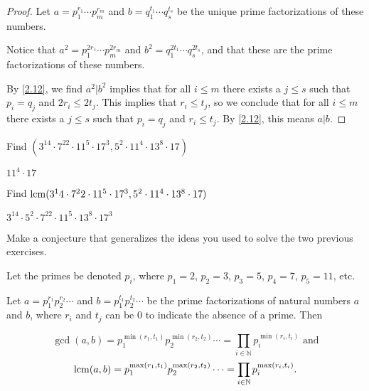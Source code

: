 \documentclass[../main.tex]{subfiles}
\begin{document}
\begin{proof}
  Let $a = p_1^{r_1} \cdots p_m^{r_m}$ and $b = q_1^{t_1} \cdots q_s^{t_s}$ be the unique prime factorizations of these numbers.

  Notice that $a^2 = p_1^{2r_1} \cdots p_m^{2r_m}$ and $b^2 = q_1^{2t_1} \cdots q_s^{2t_s}$, and that these are the prime factorizations of these numbers.

  By \ref{2.12}, we find $a^2 | b^2$ implies that for all $i \leq m$ there exists a $j \leq s$ such that $p_i = q_j$ and $2r_i \leq 2t_j$. This implies that $r_i \leq t_j$, so we conclude that for all $i \leq m$ there exists a $j \leq s$ such that $p_i = q_j$ and $r_i \leq t_j$. By \ref{2.12}, this means $a | b$.
\end{proof}



\begin{ex} \label{2.14}
  Find $(3^14 \cdot 7^22 \cdot 11^5 \cdot 17^3, 5^2 \cdot 11^4 \cdot 13^8 \cdot 17)$
\end{ex}

$11^4 \cdot 17$



\begin{ex} \label{2.15}
  Find $\operatorname{lcm} (3^14 \cdot 7^22 \cdot 11^5 \cdot 17^3, 5^2 \cdot 11^4 \cdot 13^8 \cdot 17)$
\end{ex}

$3^14 \cdot 5^2 \cdot 7^22 \cdot 11^5 \cdot 13^8 \cdot 17^3$



\begin{ex} \label{2.16}
  Make a conjecture that generalizes the ideas you used to solve the two previous exercises.
\end{ex}

\begin{PC} \label{PC 2.16}
  Let the primes be denoted $p_i$, where $p_1 = 2$, $p_2 = 3$, $p_3 = 5$, $p_4 = 7$, $p_5 = 11$, etc.

  Let $a = p_1^{r_1} p_2^{r_2} \cdots$ and $b = p_1^{t_1} p_2^{t_2} \cdots$ be the prime factorizations of natural numbers $a$ and $b$, where $r_i$ and $t_j$ can be $0$ to indicate the absence of a prime. Then

  $$\gcd (a, b) = p_1^{\min(r_1, t_1)} p_2^{\min(r_2, t_2)} \cdots = \prod_{i \in \mathbb{N}} p_i^{\min(r_i, t_i)} \mbox{ and}$$
  $$\operatorname{lcm} (a, b) = p_1^{\max(r_1, t_1)} p_2^{\max(r_2, t_2)} \cdots = \prod_{i \in \mathbb{N}} p_i^{\max(r_i, t_i)}.$$
\end{PC}
\end{document}
